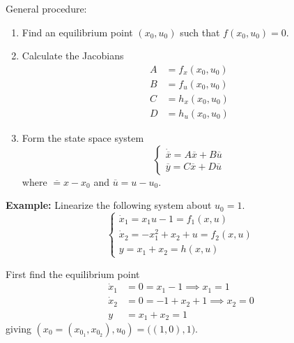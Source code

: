 \documentclass[12pt]{article}
\renewcommand{\bar}[1]{\overline{#1}}
\newcommand*{\tbf}[1]{\ifmmode\mathbf{#1}\else\textbf{#1}\fi}
\begin{document}
General procedure:
\begin{enumerate}
    \item Find an equilibrium point $(x_0, u_0)$ such that $f(x_0, u_0) = 0$.
    \item Calculate the Jacobians
    \begin{align*}
        A &= f_x(x_0, u_0)\\ 
        B &= f_u(x_0, u_0)\\
        C &= h_x(x_0, u_0)\\
        D &= h_u(x_0, u_0)
    \end{align*}
    \item Form the state space system
    \[\begin{cases}
        \dot {\bar x} = A\bar x + B \bar u\\ 
        \bar y = C\bar x + D \bar u
    \end{cases}\]
    where $\bar = x - x_0$ and $\bar u = u - u_0$.
\end{enumerate}

\tbf{Example:} Linearize the following system about $u_0 = 1$. 
\[\begin{cases}
    \dot x_1 = x_1 u - 1 = f_1(x, u)\\ 
    \dot x_2 = -x_1^2 + x_2 + u = f_2(x, u)\\ 
    y = x_1 + x_2 = h(x, u)
\end{cases}\]

First find the equilibrium point 
\begin{align*}
    \dot x_1 &= 0 = x_1 -1 \implies x_1 = 1\\ 
    \dot x_2 &= 0 = -1 + x_2 + 1 \implies x_2 = 0\\
    y &= x_1 + x_2 = 1
\end{align*}
giving $(x_0 = (x_{0_1}, x_{0_2}), u_0) = \big((1, 0), 1\big)$.
\end{document}
